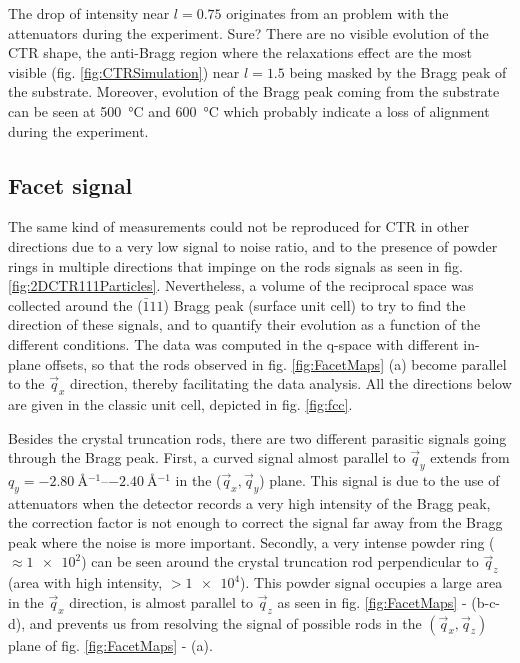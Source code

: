 The drop of intensity near $l=0.75$ originates from an problem with the attenuators during the experiment.
\textcolor{Important}{Sure?}
There are no visible evolution of the CTR shape, the anti-Bragg region where the relaxations effect are the most visible (fig. \ref{fig:CTRSimulation}) near $l=1.5$ being masked by the Bragg peak of the substrate.
Moreover, evolution of the Bragg peak coming from the substrate can be seen at \qty{500}{\degreeCelsius} and \qty{600}{\degreeCelsius} which probably indicate a loss of alignment during the experiment.

\subsection{Facet signal}

The same kind of measurements could not be reproduced for CTR in other directions due to a very low signal to noise ratio, and to the presence of powder rings in multiple directions that impinge on the rods signals as seen in fig. \ref{fig:2DCTR111Particles}.
Nevertheless, a volume of the reciprocal space was collected around the ($\bar{1}11$) Bragg peak (surface unit cell) to try to find the direction of these signals, and to quantify their evolution as a function of the different conditions.
The data was computed in the q-space with different in-plane offsets, so that the rods observed in fig. \ref{fig:FacetMaps} (a) become parallel to the $\vec{q}_x$ direction, thereby facilitating the data analysis.
All the directions below are given in the classic unit cell, depicted in fig. \ref{fig:fcc}.

Besides the crystal truncation rods, there are two different parasitic signals going through the Bragg peak.
First, a curved signal almost parallel to $\vec{q}_y$ extends from $q_y = \qtyrange{-2.80}{-2.40}{\angstrom^{-1}}$ in the ($\vec{q}_x, \vec{q}_y$) plane.
This signal is due to the use of attenuators when the detector records a very high intensity of the Bragg peak, the correction factor is not enough to correct the signal far away from the Bragg peak where the noise is more important.
Secondly, a very intense powder ring ($\approx \num{1e2}$) can be seen around the crystal truncation rod perpendicular to $\vec{q}_z$ (area with high intensity, $> \num{1e4}$).
This powder signal occupies a large area in the $\vec{q}_x$ direction, is almost parallel to $\vec{q}_z$ as seen in fig. \ref{fig:FacetMaps} - (b-c-d), and prevents us from resolving the signal of possible rods in the $(\vec{q}_x, \vec{q}_z)$ plane of fig. \ref{fig:FacetMaps} - (a).

